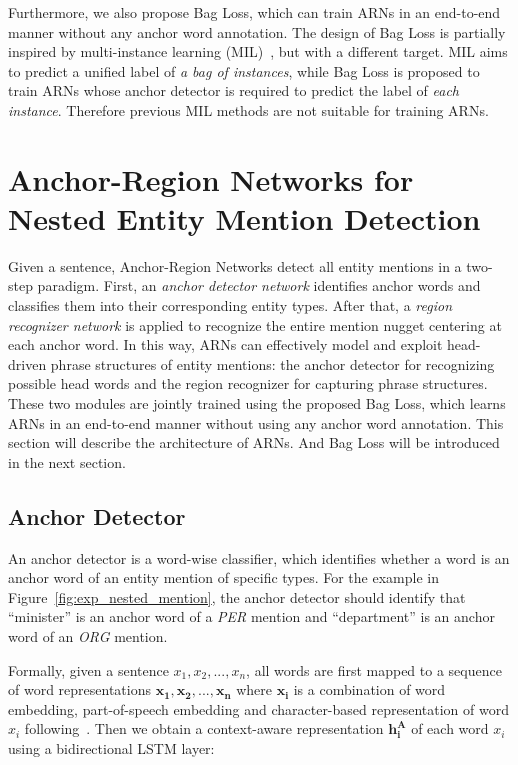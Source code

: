 \documentclass[11pt,a4paper]{article}
\begin{document}
Furthermore, we also propose Bag Loss, which can train ARNs in an end-to-end manner without any anchor word annotation. The design of Bag Loss is partially inspired by multi-instance learning (MIL)~\cite{zhou2007multi,zhou2009multi,surdeanu2012multi}, but with a different target. MIL aims to predict a unified label of \emph{a bag of instances}, while Bag Loss is proposed to train ARNs whose anchor detector is required to predict the label of \emph{each instance}. Therefore previous MIL methods are not suitable for training ARNs.


\section{Anchor-Region Networks for Nested Entity Mention Detection}
Given a sentence, Anchor-Region Networks detect all entity mentions in a two-step paradigm. First, an \emph{anchor detector network} identifies anchor words and classifies them into their corresponding entity types. After that, a \emph{region recognizer network} is applied to recognize the entire mention nugget centering at each anchor word. In this way, ARNs can effectively model and exploit head-driven phrase structures of entity mentions: the anchor detector for recognizing possible head words and the region recognizer for capturing phrase structures. These two modules are jointly trained using the proposed Bag Loss, which learns ARNs in an end-to-end manner without using any anchor word annotation. This section will describe the architecture of ARNs. And Bag Loss will be introduced in the next section.

\subsection{Anchor Detector}
An anchor detector is a word-wise classifier, which identifies whether a word is an anchor word of an entity mention of specific types. For the example in Figure~\ref{fig:exp_nested_mention}, the anchor detector should identify that ``minister'' is an anchor word of a \emph{PER} mention and ``department'' is an anchor word of an \emph{ORG} mention.

Formally, given a sentence $x_1,x_2,...,x_n$, all words are first mapped to a sequence of word representations $\bm{x_1},\bm{x_2},...,\bm{x_n}$ where $\bm{x_i}$ is a combination of word embedding, part-of-speech embedding and character-based representation of word $x_i$ following~\citet{lample2016neural}. Then we obtain a context-aware representation $\bm{h^{A}_i}$ of each word $x_i$ using a bidirectional LSTM layer:
\end{document}
